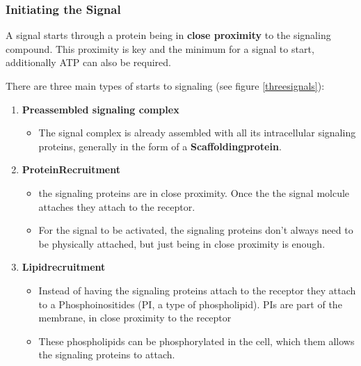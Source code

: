 \documentclass[../main.tex]{subfiles}
\begin{document}
\subsubsection{Initiating the Signal}

A signal starts through a protein being in \textbf{close proximity} to the signaling compound. This proximity is key and the minimum for a signal to start, additionally ATP can also be required.

There are three main types of starts to signaling (see figure \ref{threesignals}):
\begin{enumerate}
	\item \textbf{Preassembled signaling complex}
	\begin{itemize}
		\item The signal complex is already assembled with all its intracellular signaling proteins, generally in the form of a \textbf{\gls{Scaffoldingprotein}}.
	\end{itemize}
	\item\textbf{\gls{ProteinRecruitment}}
	\begin{itemize}
		\item the signaling proteins are in close proximity. Once the the signal molcule attaches they attach to the receptor.
		\item For the signal to be activated, the signaling proteins don't always need to be physically attached, but just being in close proximity is enough.
	\end{itemize}
	\item \textbf{\gls{Lipidrecruitment}}
	\begin{itemize}
		\item Instead of having the signaling proteins attach to the receptor they attach to a Phosphoinositides (PI, a type of phospholipid). PIs are part of the membrane, in close proximity to the receptor
		\item These phospholipids can be phosphorylated in the cell, which them allows the signaling proteins to attach.
	\end{itemize}
\end{enumerate}
\end{document}

